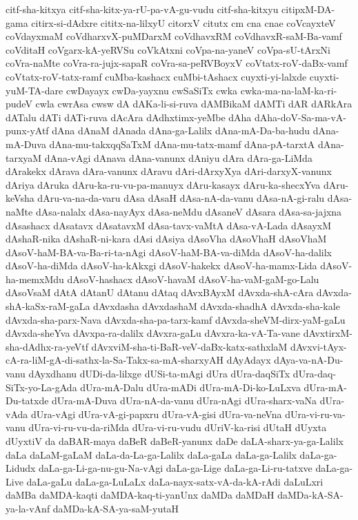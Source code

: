 {citf-sha-kitxya
citf-sha-kitx-ya-rU-pa-vA-gu-vudu
citf-sha-kitxyu
citipxM-DA-gama
citirx-si-dAdxre
cititx-na-lilxyU
citorxV
citutx
cm
cna
cnae
coVcayxteV
coVdayxmaM
coVdharxvX-puMDarxM
coVdhavxRM
coVdhavxR-saM-Ba-vamf
coVditaH
coVgarx-kA-yeRVSu
coVkAtxni
coVpa-na-yaneV
coVpa-sU-tArxNi
coVra-naMte
coVra-ra-jujx-sapaR
coVra-sa-peRVBoyxV
coVtatx-roV-daBx-vamf
coVtatx-roV-tatx-ramf
cuMba-kashacx
cuMbi-tAshacx
cuyxti-yi-lalxde
cuyxti-yuM-TA-dare
cwDayayx
cwDa-yayxnu
cwSaSiTx
cwka
cwka-ma-na-laM-ka-ri-pudeV
cwla
cwrAsa
cwsw
dA
dAKa-li-si-ruva
dAMBikaM
dAMTi
dAR
dARkAra
dATalu
dATi
dATi-ruva
dAcAra
dAdhxtimx-yeMbe
dAha
dAha-doV-Sa-ma-vA-punx-yAtf
dAna
dAnaM
dAnada
dAna-ga-Lalilx
dAna-mA-Da-ba-hudu
dAna-mA-Duva
dAna-mu-takxqqSaTxM
dAna-mu-tatx-mamf
dAna-pA-tarxtA
dAna-tarxyaM
dAna-vAgi
dAnava
dAna-vanunx
dAniyu
dAra
dAra-ga-LiMda
dArakekx
dArava
dAra-vanunx
dAravu
dAri-dArxyXya
dAri-darxyX-vanunx
dAriya
dAruka
dAru-ka-ru-vu-pa-manuyx
dAru-kasayx
dAru-ka-shecxYva
dAru-keVsha
dAru-va-na-da-varu
dAsa
dAsaH
dAsa-nA-da-vanu
dAsa-nA-gi-ralu
dAsa-naMte
dAsa-nalalx
dAsa-nayAyx
dAsa-neMdu
dAsaneV
dAsara
dAsa-sa-jajxna
dAsashacx
dAsatavx
dAsatavxM
dAsa-tavx-vaMtA
dAsa-vA-Lada
dAsayxM
dAshaR-nika
dAshaR-ni-kara
dAsi
dAsiya
dAsoVha
dAsoVhaH
dAsoVhaM
dAsoV-haM-BA-va-Ba-ri-ta-nAgi
dAsoV-haM-BA-va-diMda
dAsoV-ha-dalilx
dAsoV-ha-diMda
dAsoV-ha-kAkxgi
dAsoV-hakekx
dAsoV-ha-mamx-Lida
dAsoV-ha-memxMdu
dAsoV-hashacx
dAsoV-havaM
dAsoV-ha-vaM-gaM-go-Lalu
dAsoVsaM
dAtA
dAtanU
dAtanu
dAtaq
dAvxBAyxM
dAvxda-shA-cAra
dAvxda-shA-kaSx-raM-gaLa
dAvxdasha
dAvxdashaM
dAvxda-shadhA
dAvxda-sha-kale
dAvxda-sha-parx-Nava
dAvxda-sha-pa-tarx-kamf
dAvxda-sheVM-dirx-yaM-gaLu
dAvxda-sheYva
dAvxpa-ra-dalilx
dAvxra-gaLu
dAvxra-ka-vA-Ta-vane
dAvxtirxM-sha-dAdhx-ra-yeVtf
dAvxviM-sha-ti-BaR-veV-daBx-katx-sathxlaM
dAvxvi-tAyx-cA-ra-liM-gA-di-sathx-la-Sa-Takx-sa-mA-sharxyAH
dAyAdayx
dAya-va-nA-Du-vanu
dAyxdhanu
dUDi-da-lilxge
dUSi-ta-mAgi
dUra
dUra-daqSiTx
dUra-daq-SiTx-yo-La-gAda
dUra-mA-Dalu
dUra-mADi
dUra-mA-Di-ko-LuLxva
dUra-mA-Du-tatxde
dUra-mA-Duva
dUra-nA-da-vanu
dUra-nAgi
dUra-sharx-vaNa
dUra-vAda
dUra-vAgi
dUra-vA-gi-papxru
dUra-vA-gisi
dUra-va-neVna
dUra-vi-ru-va-vanu
dUra-vi-ru-vu-da-riMda
dUra-vi-ru-vudu
dUriV-ka-risi
dUtaH
dUyxta
dUyxtiV
da
daBAR-maya
daBeR
daBeR-yanunx
daDe
daLA-sharx-ya-ga-Lalilx
daLa
daLaM-gaLaM
daLa-da-La-ga-Lalilx
daLa-gaLa
daLa-ga-Lalilx
daLa-ga-Lidudx
daLa-ga-Li-ga-nu-gu-Na-vAgi
daLa-ga-Lige
daLa-ga-Li-ru-tatxve
daLa-ga-Live
daLa-gaLu
daLa-ga-LuLaLx
daLa-nayx-satx-vA-da-kA-rAdi
daLuLxri
daMBa
daMDA-kaqti
daMDA-kaq-ti-yanUnx
daMDa
daMDaH
daMDa-kA-SA-ya-la-vAnf
daMDa-kA-SA-ya-saM-yutaH
}
